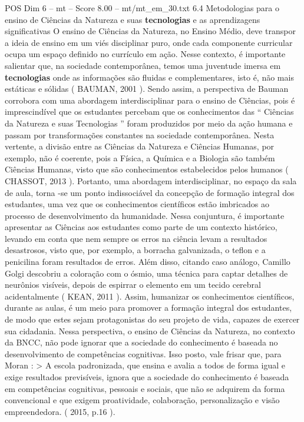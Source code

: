 \begin{textsample}{POS Dim 6 – mt – Score 8.00 – mt/mt\_em\_30.txt}  \label{ex:f6_pos_167}
6.4 Metodologias para o ensino de Ciências da Natureza e suas \textbf{tecnologias} e as aprendizagens significativas O ensino de Ciências da Natureza, no Ensino Médio, deve transpor a ideia de ensino em um viés disciplinar puro, onde cada componente curricular ocupa um espaço definido no currículo em ação.
Nesse contexto, é importante salientar que, na sociedade contemporânea, temos uma juventude imersa em \textbf{tecnologias} onde as informações são fluidas e complementares, isto é, não mais estáticas e sólidas ( BAUMAN, 2001 ).
Sendo assim, a perspectiva de Bauman corrobora com uma abordagem interdisciplinar para o ensino de Ciências, pois é imprescindível que os estudantes percebam que os conhecimentos das “ Ciências da Natureza e suas Tecnologias ” foram produzidos por meio da ação humana e passam por transformações constantes na sociedade contemporânea.
Nesta vertente, a divisão entre as Ciências da Natureza e Ciências Humanas, por exemplo, não é coerente, pois a Física, a Química e a Biologia são também Ciências Humanas, visto que são conhecimentos estabelecidos pelos humanos ( CHASSOT, 2013 ).
Portanto, uma abordagem interdisciplinar, no espaço da sala de aula, torna -se um ponto indissociável da concepção de formação integral dos estudantes, uma vez que os conhecimentos científicos estão imbricados ao processo de desenvolvimento da humanidade.
Nessa conjuntura, é importante apresentar as Ciências aos estudantes como parte de um contexto histórico, levando em conta que nem sempre os erros na ciência levam a resultados desastrosos, visto que, por exemplo, a borracha galvanizada, o teflon e a penicilina foram resultados de erros.
Além disso, citando caso análogo, Camillo Golgi descobriu a coloração com o ósmio, uma técnica para captar detalhes de neurônios visíveis, depois de espirrar o elemento em um tecido cerebral acidentalmente ( KEAN, 2011 ).
Assim, humanizar os conhecimentos científicos, durante as aulas, é um meio para promover a formação integral dos estudantes, de modo que estes sejam protagonistas do seu projeto de vida, capazes de exercer sua cidadania.
Nessa perspectiva, o ensino de Ciências da Natureza, no contexto da BNCC, não pode ignorar que a sociedade do conhecimento é baseada no desenvolvimento de competências cognitivas.
Isso posto, vale frisar que, para Moran : > A escola padronizada, que ensina e avalia a todos de forma igual e exige resultados previsíveis, ignora que a sociedade do conhecimento é baseada em competências cognitivas, pessoais e sociais, que não se adquirem da forma convencional e que exigem proatividade, colaboração, personalização e visão empreendedora. ( 2015, p.16 ).

\end{textsample}
